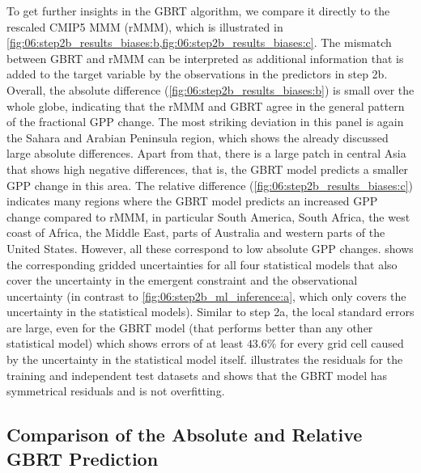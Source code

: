 To get further insights in the \ac{GBRT} algorithm, we compare it directly to
the rescaled \acs{CMIP}5 \ac{MMM} (r\acs{MMM}), which is illustrated in
\cref{fig:06:step2b_results_biases:b,fig:06:step2b_results_biases:c}. The
mismatch between \ac{GBRT} and r\acs{MMM} can be interpreted as additional
information that is added to the target variable by the observations in the
predictors in step 2b. Overall, the absolute difference
(\cref{fig:06:step2b_results_biases:b}) is small over the whole globe,
indicating that the r\acs{MMM} and \ac{GBRT} agree in the general pattern of
the fractional \ac{GPP} change. The most striking deviation in this panel is
again the Sahara and Arabian Peninsula region, which shows the already
discussed large absolute differences. Apart from that, there is a large patch
in central Asia that shows high negative differences, that is, the \ac{GBRT}
model predicts a smaller \ac{GPP} change in this area. The relative difference
(\cref{fig:06:step2b_results_biases:c}) indicates many regions where the
\ac{GBRT} model predicts an increased \ac{GPP} change compared to r\acs{MMM},
in particular South America, South Africa, the west coast of Africa, the Middle
East, parts of Australia and western parts of the United States. However, all
these correspond to low absolute \ac{GPP} changes.
 shows the corresponding gridded
uncertainties for all four statistical models that also cover the uncertainty
in the emergent constraint and the observational uncertainty (in contrast to
\cref{fig:06:step2b_ml_inference:a}, which only covers the uncertainty in the
statistical models). Similar to step 2a, the local standard errors are large,
even for the \ac{GBRT} model (that performs better than any other statistical
model) which shows errors of at least $43.6 \unit{\%}$ for every grid cell
caused by the uncertainty in the statistical model itself.
 illustrates the residuals for the training and
independent test datasets and shows that the \ac{GBRT} model has symmetrical
residuals and is not overfitting.


\subsection{Comparison of the Absolute and Relative \acs{GBRT} Prediction}
\label{subsec:06:comparison_step2a_step2b}

